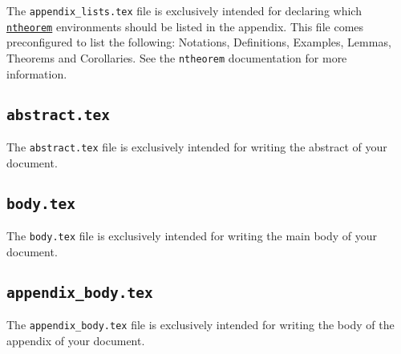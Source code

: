 The \texttt{appendix\_lists.tex} file is exclusively intended for declaring which \href{https://ctan.org/pkg/ntheorem}{\texttt{ntheorem}} environments should be listed in the appendix. This file comes preconfigured to list the following: Notations, Definitions, Examples, Lemmas, Theorems and Corollaries. See the \texttt{ntheorem} documentation for more information.

\subsection{\texttt{abstract.tex}}
\label{sec:abstract.tex}

The \texttt{abstract.tex} file is exclusively intended for writing the abstract of your document.

\subsection{\texttt{body.tex}}
\label{sec:body.tex}

The \texttt{body.tex} file is exclusively intended for writing the main body of your document.

\subsection{\texttt{appendix\_body.tex}}
\label{sec:appendix_body.tex}

The \texttt{appendix\_body.tex} file is exclusively intended for writing the body of the appendix of your document.

